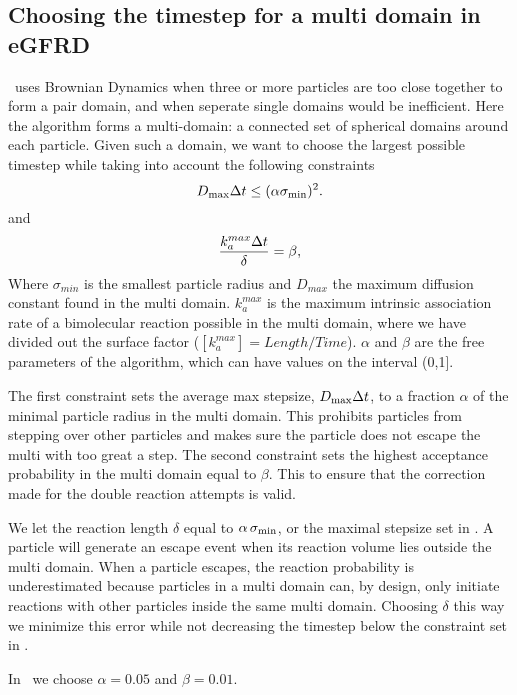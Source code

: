 \subsection{Choosing the timestep for a multi domain in eGFRD}

\GFRD\, uses Brownian Dynamics when three or more particles are too close together to form a pair domain, and when seperate single domains would be inefficient. Here the algorithm forms a multi-domain: a connected set of spherical domains around each particle. Given such a domain, we want to choose the largest possible timestep while taking into account the following constraints
\begin{equation}
 D_{\rm max} \Delta t \leq (\alpha \sigma_{\rm min})^2.
 \elabel{BDcntrI}
\end{equation}
and
\begin{equation}
 \frac{k_{a}^{max} \Delta t}{\delta} = \beta,
 \elabel{BDcntrII}
\end{equation}
Where $\sigma_{min}$ is the smallest particle radius and $D_{max}$ the maximum diffusion constant found in the multi domain. $k_{a}^{max}$ is the maximum intrinsic association rate of a bimolecular reaction possible in the multi domain, where we have divided out the surface factor ($[k_{a}^{max}] = Length/Time $). $\alpha$ and $\beta$ are the free parameters of the algorithm, which can have values on the interval (0,1].

The first constraint sets the average max stepsize, $D_{\rm max} \Delta t$, to a fraction $\alpha$ of the minimal particle radius in the multi domain. This prohibits particles from stepping over other particles and makes sure the particle does not escape the multi with too great a step. The second constraint sets the highest acceptance probability in the multi domain equal to $\beta$. This to ensure that the correction made for the double reaction attempts is valid. 

We let the reaction length $\delta$ equal to $\alpha \, \sigma_{\rm min}$, or the maximal stepsize set in . A particle will generate an escape event when its reaction volume lies outside the multi domain. When a particle escapes, the reaction probability is underestimated because particles in a multi domain can, by design, only initiate reactions with other particles inside the same multi domain. Choosing $\delta$ this way we minimize this error while not decreasing the timestep below the constraint set in .

In \GFRD\, we choose $\alpha = 0.05$ and $\beta = 0.01$.



